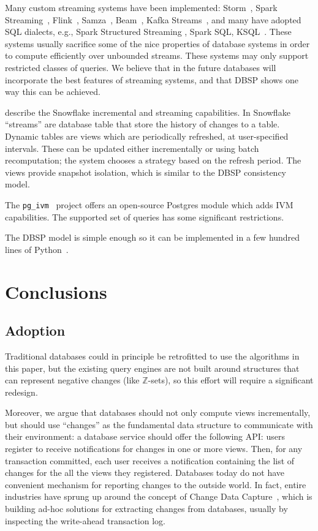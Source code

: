 \documentclass[twocolumn
]{svjour3}
\numberwithin{equation}{section}
\newcommand{\dbsp}{DBSP\xspace}
\newcommand{\zrs}{$\Z$-sets\xspace} %
\newcommand{\code}[1]{\mbox{\texttt{#1}}}
\newcommand{\Z}{\mathbb{Z}}  %
\begin{document}
Many custom streaming systems have been implemented:
Storm~\cite{toshnival-sigmod14}, Spark
Streaming~\cite{zaharia-sosp13}, Flink~\cite{carbone-ieee15},
Samza~\cite{noghabi-vldb17}, Beam~\cite{akidau-vldb15}, Kafka
Streams~\cite{wang-sigmod21}, and many have adopted SQL dialects,
e.g., Spark Structured Streaming \cite{armbrust-sigmod18}, Spark SQL,
KSQL~\cite{jafarpour-edbt19}.  These systems usually sacrifice some of
the nice properties of database systems in order to compute
efficiently over unbounded streams.  These systems may only support
restricted classes of queries.  We believe that in the future
databases will incorporate the best features of streaming systems, and
that \dbsp shows one way this can be achieved.

\cite{akidau-amd23,akidau-debs24} describe the Snowflake incremental
and streaming capabilities.  In Snowflake ``streams'' are database
table that store the history of changes to a table.  Dynamic tables
are views which are periodically refreshed, at user-specified
intervals.  These can be updated either incrementally or using batch
recomputation; the system chooses a strategy based on the refresh
period.  The views provide snapshot isolation, which is similar to the
DBSP consistency model.

The \code{pg\_ivm}~\cite{pgivm} project offers an open-source Postgres
module which adds IVM capabilities.  The supported set of queries has
some significant restrictions.

The \dbsp model is simple enough so it can be implemented in a few
hundred lines of Python~\cite{dbsp-python}.

%
\section{Conclusions}\label{sec:conclusions}%

\subsection{Adoption}

Traditional databases could in principle be retrofitted to use the
algorithms in this paper, but the existing query engines are not built
around structures that can represent negative changes (like \zrs), so
this effort will require a significant redesign.

Moreover, we argue that databases should not only compute views
incrementally, but should use ``changes'' as the fundamental data
structure to communicate with their environment: a database service
should offer the following API: users register to receive
notifications for changes in one or more views.  Then, for any
transaction committed, each user receives a notification containing
the list of changes for the all the views they registered.  Databases
today do not have convenient mechanism for reporting changes to the
outside world.  In fact, entire industries have sprung up around the
concept of Change Data Capture~\cite{cdc}, which is building ad-hoc
solutions for extracting changes from databases, usually by inspecting
the write-ahead transaction log.
\end{document}
